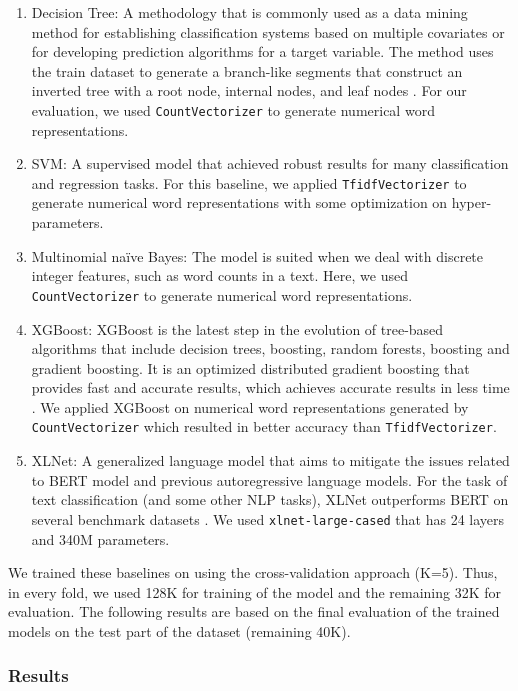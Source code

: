 \documentclass{article}
\begin{document}
\begin{enumerate}
    \item Decision Tree: A methodology that is commonly used as a data mining method for establishing classification systems based on multiple covariates or for developing prediction algorithms for a target variable. The method uses the train dataset to generate a branch-like segments that construct an inverted tree with a root node, internal nodes, and leaf nodes \cite{song2015decision}. For our evaluation, we used \verb+CountVectorizer+ to generate numerical word representations.
    \item SVM: A supervised model that achieved robust results for many classification and regression tasks. For this baseline, we applied \verb+TfidfVectorizer+ to generate numerical word representations with some optimization on hyper-parameters.
    \item Multinomial naïve Bayes: The model is suited when we deal with discrete integer features, such as word counts in a text. Here, we used \verb+CountVectorizer+ to generate numerical word representations.
    \item XGBoost: XGBoost is the latest step in the evolution of tree-based algorithms that include decision trees, boosting, random forests, boosting and gradient boosting. It is an optimized distributed gradient boosting that provides fast and accurate results, which achieves accurate results in less time \cite{chen2016xgboost}. We applied XGBoost on numerical word representations generated by \verb+CountVectorizer+ which resulted in better accuracy than \verb+TfidfVectorizer+.
\item XLNet: A generalized language model that aims to mitigate the issues related to BERT model and previous autoregressive language models. For the task of text classification (and some other NLP tasks), XLNet outperforms BERT on several benchmark datasets \cite{yang2019XLNet}. We used \verb+xlnet-large-cased+ that has 24 layers and 340M parameters.
\end{enumerate}

We trained these baselines on using the cross-validation approach (K=5). Thus, in every fold, we used 128K for training of the model and the remaining 32K for evaluation. The following results are based on the final evaluation of the trained models on the test part of the dataset (remaining 40K).

\subsubsection{Results}
\end{document}
